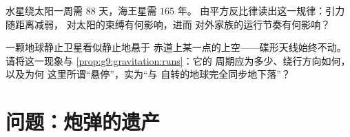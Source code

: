 \begin{exercise}[$\star\star$]\label{exo:g9:gravitation:11}
水星绕太阳一周需 $88$ 天，海王星需 $165$ 年。
由平方反比律读出这一规律：引力随距离减弱，
对太阳的束缚有何影响，进而
对外家族的运行节奏有何影响？
\end{exercise}

\begin{exercise}[$\star\star\star$]\label{exo:g9:gravitation:12}
一颗地球静止卫星看似静止地悬于
赤道上某一点的上空——碟形天线始终不动。
请将这一现象与
\cref{prop:g9:gravitation:runs}：它的
周期应为多少、绕行方向如何，以及为何
这里所谓“悬停”，实为“与
自转的地球完全同步地下落”？
\end{exercise}

\section{问题：炮弹的遗产}

